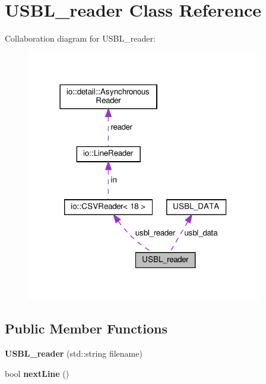 \hypertarget{classUSBL__reader}{}\section{U\+S\+B\+L\+\_\+reader Class Reference}
\label{classUSBL__reader}


Collaboration diagram for U\+S\+B\+L\+\_\+reader\+:\nopagebreak
\begin{figure}[H]
\begin{center}
\leavevmode
\includegraphics[width=290pt]{classUSBL__reader__coll__graph}
\end{center}
\end{figure}
\subsection*{Public Member Functions}
\begin{DoxyCompactItemize}
\item 
\mbox{\label{classUSBL__reader_a80d29b2cda4006b7764d4fe8d855afcc}} 
{\bfseries U\+S\+B\+L\+\_\+reader} (std\+::string filename)
\item 
\mbox{\label{classUSBL__reader_a7653a3792b19dc442ab5d8502422db2a}} 
bool {\bfseries next\+Line} ()
\end{DoxyCompactItemize}
